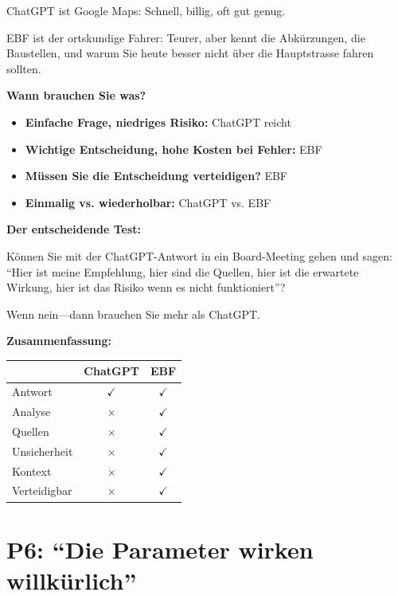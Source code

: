 \begin{tcolorbox}[colback=yellow!5!white, colframe=yellow!75!black,
    title=P1-$\mathcal{P}$-L: Lang (Praxis)]
ChatGPT ist Google Maps: Schnell, billig, oft gut genug.

EBF ist der ortskundige Fahrer: Teurer, aber kennt die Abkürzungen, die Baustellen, und warum Sie heute besser nicht über die Hauptstrasse fahren sollten.

\textbf{Wann brauchen Sie was?}

\begin{itemize}[nosep]
    \item \textbf{Einfache Frage, niedriges Risiko:} ChatGPT reicht
    \item \textbf{Wichtige Entscheidung, hohe Kosten bei Fehler:} EBF
    \item \textbf{Müssen Sie die Entscheidung verteidigen?} EBF
    \item \textbf{Einmalig vs. wiederholbar:} ChatGPT vs. EBF
\end{itemize}

\textbf{Der entscheidende Test:}

Können Sie mit der ChatGPT-Antwort in ein Board-Meeting gehen und sagen: ``Hier ist meine Empfehlung, hier sind die Quellen, hier ist die erwartete Wirkung, hier ist das Risiko wenn es nicht funktioniert''?

Wenn nein---dann brauchen Sie mehr als ChatGPT.

\textbf{Zusammenfassung:}

\begin{center}
\begin{tabular}{lcc}
& \textbf{ChatGPT} & \textbf{EBF} \\
\midrule
Antwort & $\checkmark$ & $\checkmark$ \\
Analyse & $\times$ & $\checkmark$ \\
Quellen & $\times$ & $\checkmark$ \\
Unsicherheit & $\times$ & $\checkmark$ \\
Kontext & $\times$ & $\checkmark$ \\
Verteidigbar & $\times$ & $\checkmark$ \\
\end{tabular}
\end{center}

\end{tcolorbox}

\section{P6: ``Die Parameter wirken willkürlich''}
\label{sec:da2-p6}

